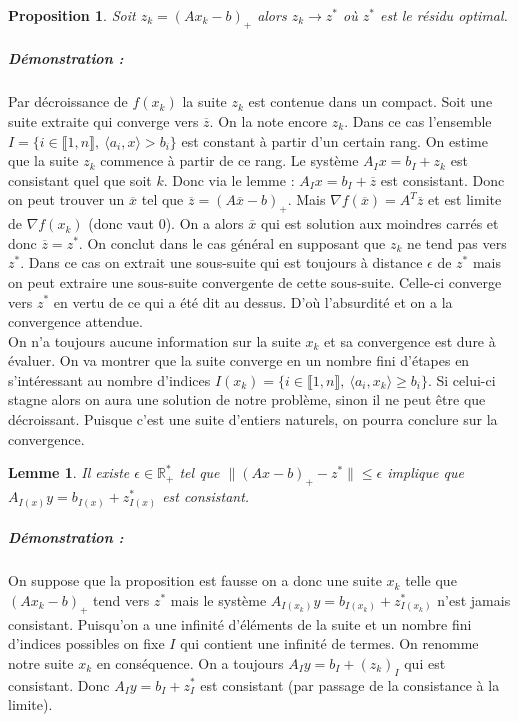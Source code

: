 \documentclass[10pt,a4paper]{article}
\newtheorem{prop}{Proposition}
\newtheorem{lemma}{Lemme}
\begin{document}
\begin{prop}
Soit $z_k=(Ax_k-b)_+$ alors $z_k \rightarrow z^*$ où $z^*$ est le résidu optimal.
\end{prop}
\subparagraph{Démonstration :} Par décroissance de $f(x_k)$ la suite $z_k$ est contenue dans un compact.
Soit une suite extraite qui converge vers $\overline{z}$.
On la note encore $z_k$.
Dans ce cas l'ensemble $I= \lbrace i \in \llbracket 1,n \rrbracket, \ \langle a_i,x \rangle > b_i \rbrace$ est constant à partir d'un certain rang.
On estime que la suite $z_k$ commence à partir de ce rang.
Le système $A_Ix=b_I+z_k$ est consistant quel que soit $k$.
Donc via le lemme : $A_Ix=b_I+\overline{z}$ est consistant.
Donc on peut trouver un $\overline{x}$ tel que $\overline{z}=(A\overline{x}-b)_+$.
Mais $\nabla f(\overline{x})=A^T \overline{z}$ et est limite de $\nabla f(x_k)$ (donc vaut 0).
On a alors $\overline{x}$ qui est solution aux moindres carrés et donc $\overline{z}=z^*$.
On conclut dans le cas général en supposant que $z_k$ ne tend pas vers $z^*$.
Dans ce cas on extrait une sous-suite qui est toujours à distance $\epsilon$ de $z^*$ mais on peut extraire une sous-suite convergente de cette sous-suite.
Celle-ci converge vers $z^*$ en vertu de ce qui a été dit au dessus.
D'où l'absurdité et on a la convergence attendue.\\
On n'a toujours aucune information sur la suite $x_k$ et sa convergence est dure à évaluer.
On va montrer que la suite converge en un nombre fini d'étapes en s'intéressant au nombre d'indices $I(x_k)=\lbrace i \in \llbracket 1,n \rrbracket, \ \langle a_i,x_k \rangle \ge b_i \rbrace$.
Si celui-ci stagne alors on aura une solution de notre problème, sinon il ne peut être que décroissant.
Puisque c'est une suite d'entiers naturels, on pourra conclure sur la convergence.
\begin{lemma}
Il existe $\epsilon \in \mathbb{R}_+^*$ tel que $\| (Ax-b)_+ -z^* \| \le \epsilon$ implique que $A_{I(x)}y=b_{I(x)}+z_{I(x)}^*$ est consistant.
\end{lemma}
\subparagraph{Démonstration :} On suppose que la proposition est fausse on a donc une suite $x_k$ telle que $(Ax_k-b)_+$ tend vers $z^*$ mais le système $A_{I(x_k)}y=b_{I(x_k)}+z_{I(x_k)}^*$ n'est jamais consistant.
Puisqu'on a une infinité d'éléments de la suite et un nombre fini d'indices possibles on fixe $I$ qui contient une infinité de termes.
On renomme notre suite $x_k$ en conséquence.
On a toujours $A_Iy=b_I+(z_k)_I$ qui est consistant.
Donc $A_Iy=b_I+z^*_I$ est consistant (par passage de la consistance à la limite).
\end{document}
